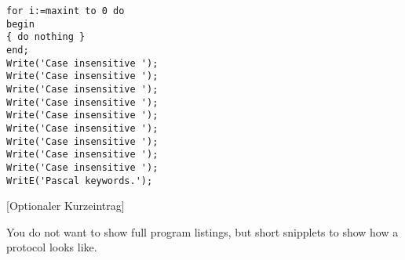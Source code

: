 \begin{illfloat}
  \begin{lstlisting}
for i:=maxint to 0 do
begin
{ do nothing }
end;
Write('Case insensitive ');
Write('Case insensitive ');
Write('Case insensitive ');
Write('Case insensitive ');
Write('Case insensitive ');
Write('Case insensitive ');
Write('Case insensitive ');
Write('Case insensitive ');
Write('Case insensitive ');
WritE('Pascal keywords.');
  \end{lstlisting}%
  [Optionaler Kurzeintrag]
\end{illfloat}

You do not want to show full program listings, but short snipplets to show how a protocol looks like.

